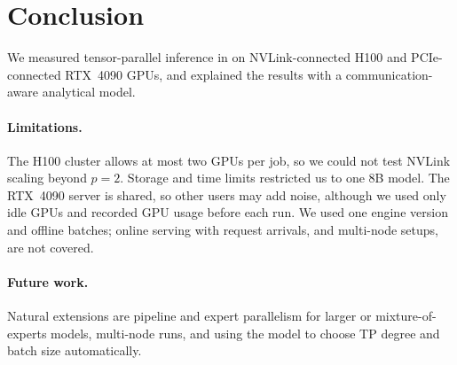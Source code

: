 \section{Conclusion}
\label{sec:conclusion}

We measured tensor-parallel inference in \vllm on NVLink-connected H100 and PCIe-connected
RTX~4090 GPUs, and explained the results with a communication-aware analytical model.

\paragraph{Limitations.}
The H100 cluster allows at most two GPUs per job, so we could not test NVLink scaling
beyond $p=2$.
Storage and time limits restricted us to one 8B model.
The RTX~4090 server is shared, so other users may add noise, although we used only idle
GPUs and recorded GPU usage before each run.
We used one engine version and offline batches; online serving with request arrivals,
and multi-node setups, are not covered.

\paragraph{Future work.}
Natural extensions are pipeline and expert parallelism for larger or mixture-of-experts
models, multi-node runs, and using the model to choose TP degree and batch size
automatically.
